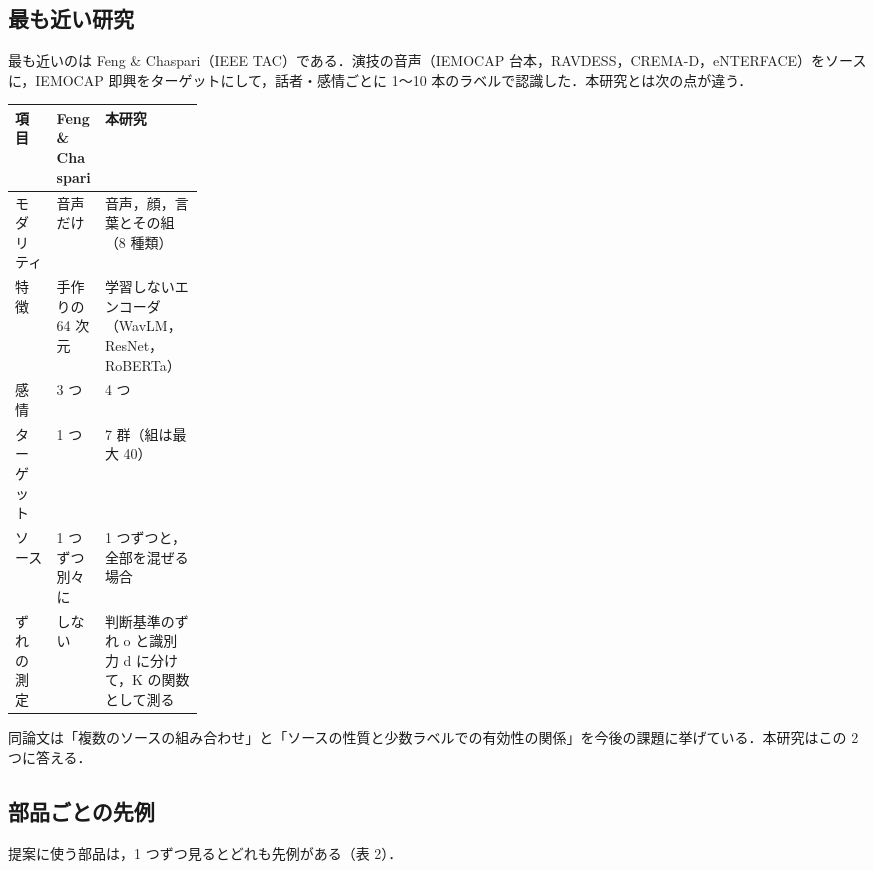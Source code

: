 \documentclass[a4paper,11pt]{ltjsarticle}
\begin{document}
\subsection{最も近い研究}

最も近いのは Feng \& Chaspari（IEEE TAC）である．演技の音声（IEMOCAP 台本，RAVDESS，CREMA-D，eNTERFACE）をソースに，IEMOCAP 即興をターゲットにして，話者・感情ごとに 1〜10 本のラベルで認識した．本研究とは次の点が違う．

\begin{tabularx}{\linewidth}{@{}p{0.22\linewidth}LL@{}}
\toprule
項目 & Feng \& Chaspari & 本研究 \\
\midrule
モダリティ & 音声だけ & 音声，顔，言葉とその組（8 種類） \\
特徴 & 手作りの 64 次元 & 学習しないエンコーダ（WavLM，ResNet，RoBERTa） \\
感情 & 3 つ & 4 つ \\
ターゲット & 1 つ & 7 群（組は最大 40） \\
ソース & 1 つずつ別々に & 1 つずつと，全部を混ぜる場合 \\
ずれの測定 & しない & 判断基準のずれ o と識別力 d に分けて，K の関数として測る \\
\bottomrule
\end{tabularx}

同論文は「複数のソースの組み合わせ」と「ソースの性質と少数ラベルでの有効性の関係」を今後の課題に挙げている．本研究はこの 2 つに答える．

\subsection{部品ごとの先例}

提案に使う部品は，1 つずつ見るとどれも先例がある（表 2）．
\end{document}
